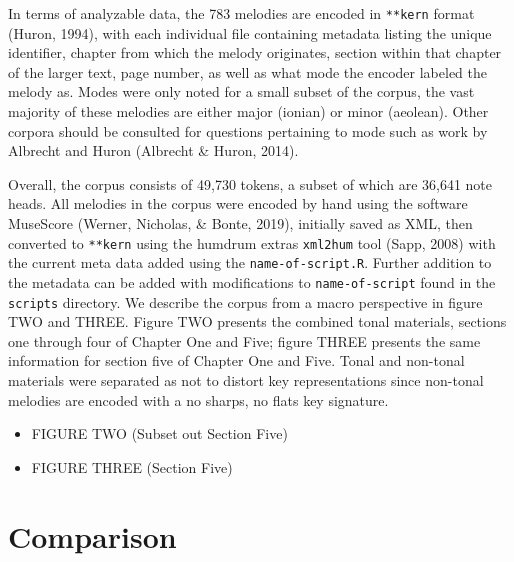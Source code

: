 \documentclass[english,man]{apa6}
\providecommand{\tightlist}{%
  \setlength{\itemsep}{0pt}\setlength{\parskip}{0pt}}
\begin{document}
In terms of analyzable data, the 783 melodies are encoded in \texttt{**kern} format (Huron, 1994), with each individual file containing metadata listing the unique identifier, chapter from which the melody originates, section within that chapter of the larger text, page number, as well as what mode the encoder labeled the melody as.
Modes were only noted for a small subset of the corpus, the vast majority of these melodies are either major (ionian) or minor (aeolean).
Other corpora should be consulted for questions pertaining to mode such as work by Albrecht and Huron (Albrecht \& Huron, 2014).

Overall, the corpus consists of 49,730 tokens, a subset of which are 36,641 note heads.
All melodies in the corpus were encoded by hand using the software MuseScore (Werner, Nicholas, \& Bonte, 2019), initially saved as XML, then converted to \texttt{**kern} using the humdrum extras \texttt{xml2hum} tool (Sapp, 2008) with the current meta data added using the \texttt{name-of-script.R}.
Further addition to the metadata can be added with modifications to \texttt{name-of-script} found in the \texttt{scripts} directory.
We describe the corpus from a macro perspective in figure TWO and THREE.
Figure TWO presents the combined tonal materials, sections one through four of Chapter One and Five; figure THREE presents the same information for section five of Chapter One and Five.
Tonal and non-tonal materials were separated as not to distort key representations since non-tonal melodies are encoded with a no sharps, no flats key signature.

\begin{itemize}
\tightlist
\item
  FIGURE TWO (Subset out Section Five)
\item
  FIGURE THREE (Section Five)
\end{itemize}

\hypertarget{comparison}{%
\section{Comparison}\label{comparison}}
\end{document}
